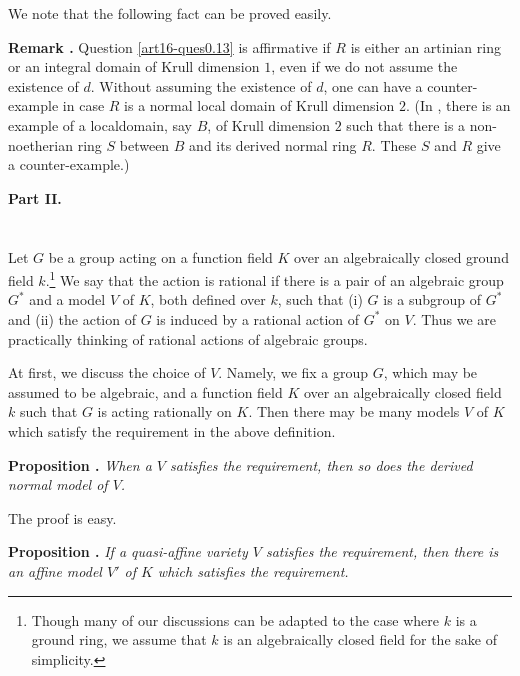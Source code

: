 We note that the following fact can be proved easily.

\medskip
\noindent
{\bf Remark .\label{art16-rem0.14}}
Question \ref{art16-ques0.13} is affirmative if $R$ is either an artinian ring or an integral domain of Krull dimension $1$, even if we do not assume the existence of $d$. Without assuming the existence of $d$, one can have a counter-example in case $R$ is a normal local domain of Krull dimension $2$. (In \cite{art16-key-L}, there is an example of a local\pageoriginale domain, say $B$, of Krull dimension $2$ such that there is a non-noetherian ring $S$ between $B$ and its derived normal ring $R$. These $S$ and $R$ give a counter-example.)


\bigskip
\begin{center}
{\bf\Large Part II.}
\end{center}

\section{}\label{art16-sec1}
Let $G$ be a group acting on a function field $K$ over an algebraically closed ground field $k$.\footnote{Though many of our discussions can be adapted to the case where $k$ is a ground ring, we assume that $k$ is an algebraically closed field for the sake of simplicity.} We say that the action is rational if there is a pair of an algebraic group $G^{*}$ and a model $V$ of $K$, both defined over $k$, such that (i) $G$ is a subgroup of $G^{*}$ and (ii) the action of $G$ is induced by a rational action of $G^{*}$ on $V$. Thus we are practically thinking of rational actions of algebraic groups.

At first, we discuss the choice of $V$. Namely, we fix a group $G$, which may be assumed to be algebraic, and a function field $K$ over an algebraically closed field $k$ such that $G$ is acting rationally on $K$. Then there may be many models $V$ of $K$ which satisfy the requirement in the above definition.

\medskip
\noindent
{\bf Proposition .\label{art16-prop1.1}}
{\em When a $V$ satisfies the requirement, then so does the derived normal model of $V$.}
\smallskip

The proof is easy.

\medskip
\noindent
{\bf Proposition .\label{art16-prop1.2}}
{\em If a quasi-affine variety $V$ satisfies the requirement, then there is an affine model $V'$ of $K$ which satisfies the requirement.}

